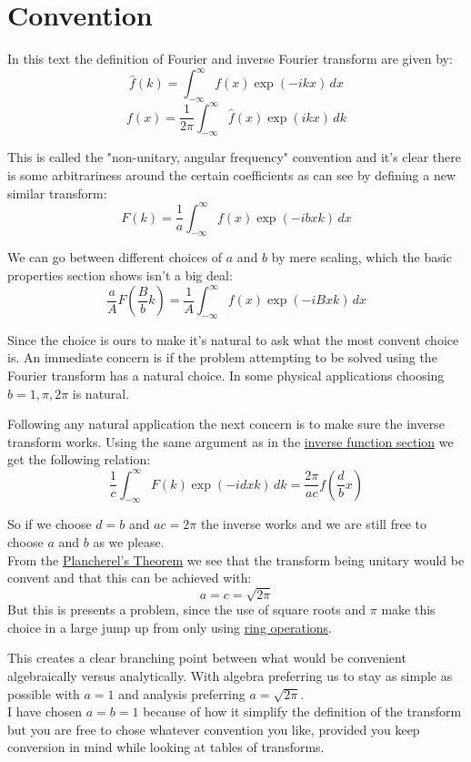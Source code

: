 \documentclass[12pt]{report}
\begin{document}
\section{Convention}
In this text the definition of Fourier and inverse Fourier transform are given by:
\[\hat{f}(k) = \int_{-\infty}^{\infty}f(x)\exp(-ikx)\,dx\]
\[f(x) =\frac{1}{2\pi} \int_{-\infty}^{\infty}\hat{f}(x)\exp(ikx)\,dk\]

This is called the "non-unitary, angular frequency" convention and it's clear there is some arbitrariness around the certain coefficients as can see by defining a new similar transform:
\[F(k) = \frac{1}{a}\int_{-\infty}^{\infty}f(x)\exp(-ibxk)\,dx\]

We can go between different choices of $a$ and $b$ by mere scaling, which the basic properties section shows isn't a big deal:
\[\frac{a}{A}F\left(\frac{B}{b}k\right) = \frac{1}{A}\int_{-\infty}^{\infty}f(x)\exp(-iBxk)\,dx\]

Since the choice is ours to make it's natural to ask what the most convent choice is.
An immediate concern is if the problem attempting to be solved using the Fourier transform has a natural choice.
In some physical applications choosing $b= 1,\pi,2\pi$ is natural.

Following any natural application the next concern is to make sure the inverse transform works.
Using the same argument as in the \hyperref[sec:inv-trans]{inverse function section} we get the following relation:
\[\frac{1}{c}\int_{-\infty}^{\infty}F(k)\exp(-idxk)\,dk = \frac{2\pi}{ac}f\left(\frac{d}{b}x\right)\]

So if we choose $d=b$ and $ac = 2\pi$ the inverse works and we are still free to choose $a$ and $b$ as we please.
\\

From the \hyperref[sec:plancherel]{Plancherel's Theorem} we see that the transform being unitary would be convent and that this can be achieved with:
\[a = c = \sqrt{2\pi}\]
But this is presents a problem, since the use of square roots and $\pi$ make this choice in a large jump up from only using \hyperref[sec:ring]{ring operations}.

This creates a clear branching point between what would be convenient algebraically versus analytically.
With algebra preferring us to stay as simple as possible with $a=1$ and analysis preferring $a=\sqrt{2\pi}$.
\\

I have chosen $a=b=1$ because of how it simplify the definition of the transform but you are free to chose whatever convention you like, provided you keep conversion in mind while looking at tables of transforms.
\\
\end{document}
